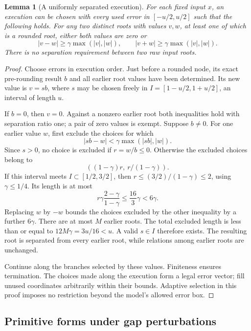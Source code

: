 \documentclass[11pt,a4paper]{article}
\newtheorem{lemma}[theorem]{Lemma}
\theoremstyle{definition}
\theoremstyle{remark}
\newcommand{\abs}[1]{\lvert #1\rvert}
\begin{document}
\begin{lemma}[A uniformly separated execution]\label{lem:sep}
For each fixed input $x$, an execution can be chosen with every used error in
$[-u/2,u/2]$ such that the following holds. For any two distinct roots with
values $v,w$, at least one of which is a rounded root, either both values are
zero or
\begin{equation}\label{eq:sep}
 \abs{v-w}\ge\gamma\max(\abs v,\abs w),\qquad
 \abs{v+w}\ge\gamma\max(\abs v,\abs w).
\end{equation}
There is no separation requirement between two raw input roots.
\end{lemma}

\begin{proof}
Choose errors in execution order. Just before a rounded node, its exact
pre-rounding result $b$ and all earlier root values have been determined. Its
new value is $v=sb$, where $s$ may be chosen freely in
$I=[1-u/2,1+u/2]$, an interval of length $u$.

If $b=0$, then $v=0$. Against a nonzero earlier root both inequalities hold
with separation ratio one; a pair of zero values is exempt. Suppose $b\ne0$.
For one earlier value $w$, first exclude the choices for which
\[
 \abs{sb-w}<\gamma\max(\abs{sb},\abs w).
\]
Since $s>0$, no choice is excluded if $r=w/b\le0$. Otherwise the excluded
choices belong to
\[
 ( (1-\gamma)r,\ r/(1-\gamma) ).
\]
If this interval meets $I\subset[1/2,3/2]$, then
$r\le(3/2)/(1-\gamma)\le2$, using $\gamma\le1/4$. Its length is at most
\[
 r\gamma\frac{2-\gamma}{1-\gamma}
 \le\frac{16}{3}\gamma<6\gamma.
\]
Replacing $w$ by $-w$ bounds the choices excluded by the other inequality
by a further $6\gamma$. There are at most $M$ earlier roots. The total excluded
length is less than or equal to $12M\gamma=3u/16<u$. A valid $s\in I$ therefore
exists. The resulting root is separated from every earlier root, while
relations among earlier roots are unchanged.

Continue along the branches selected by these values. Finiteness ensures
termination. The choices made along the execution form a legal error vector;
fill unused coordinates arbitrarily within their bounds. Adaptive selection
in this proof imposes no restriction beyond the model's allowed error box.
\end{proof}

\subsection{Primitive forms under gap perturbations}
\end{document}
